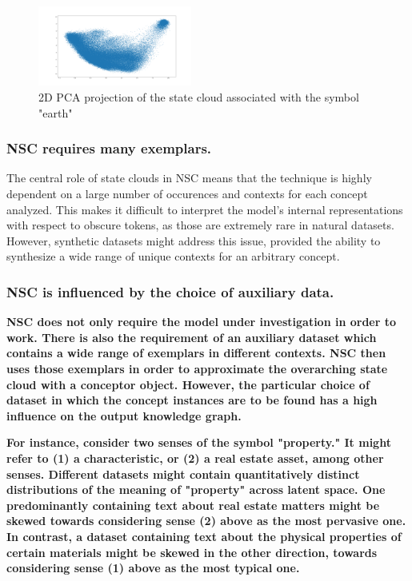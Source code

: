 \begin{figure}[h]
    \centering
    \includegraphics[width=0.45\textwidth]{img/earth.png}
    \caption{2D PCA projection of the state cloud associated with the symbol "earth"}\label{fig:earth}
\end{figure}

\subsubsection{NSC requires many exemplars.}

The central role of state clouds in NSC means that the technique is highly dependent on a large number of occurences and contexts for each concept analyzed. This makes it difficult to interpret the model's internal representations with respect to obscure tokens, as those are extremely rare in natural datasets. However, synthetic datasets might address this issue, provided the ability to synthesize a wide range of unique contexts for an arbitrary concept.

\subsubsection{NSC is influenced by the choice of auxiliary data.}

\textbf{NSC does not only require the model under investigation in order to work. There is also the requirement of an auxiliary dataset which contains a wide range of exemplars in different contexts. NSC then uses those exemplars in order to approximate the overarching state cloud with a conceptor object. However, the particular choice of dataset in which the concept instances are to be found has a high influence on the output knowledge graph.}

\textbf{For instance, consider two senses of the symbol "property." It might refer to (1) a characteristic, or (2) a real estate asset, among other senses. Different datasets might contain quantitatively distinct distributions of the meaning of "property" across latent space. One predominantly containing text about real estate matters might be skewed towards considering sense (2) above as the most pervasive one. In contrast, a dataset containing text about the physical properties of certain materials might be skewed in the other direction, towards considering sense (1) above as the most typical one.}

